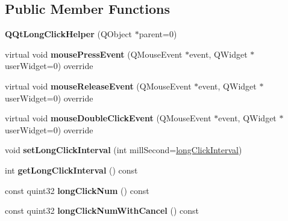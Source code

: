 \subsection*{Public Member Functions}
\begin{DoxyCompactItemize}
\item 
\mbox{\label{class_q_qt_long_click_helper_a66b65c1a0e470ca7849f98b37b6dff5f}} 
{\bfseries Q\+Qt\+Long\+Click\+Helper} (Q\+Object $\ast$parent=0)
\item 
\mbox{\label{class_q_qt_long_click_helper_ac7b35933971454a5544d1bdaacc788f7}} 
virtual void {\bfseries mouse\+Press\+Event} (Q\+Mouse\+Event $\ast$event, Q\+Widget $\ast$user\+Widget=0) override
\item 
\mbox{\label{class_q_qt_long_click_helper_a47ed080d282addb183847919bcb0ff88}} 
virtual void {\bfseries mouse\+Release\+Event} (Q\+Mouse\+Event $\ast$event, Q\+Widget $\ast$user\+Widget=0) override
\item 
\mbox{\label{class_q_qt_long_click_helper_a2fa0272b307ab6bee2a4dcdd3a1d662b}} 
virtual void {\bfseries mouse\+Double\+Click\+Event} (Q\+Mouse\+Event $\ast$event, Q\+Widget $\ast$user\+Widget=0) override
\item 
\mbox{\label{class_q_qt_long_click_helper_a0e9a46cd30c908bc8b714bbe971c9f3b}} 
void {\bfseries set\+Long\+Click\+Interval} (int mill\+Second=\mbox{\hyperlink{class_q_qt_long_click_helper_aae392691a102b1b7de765494bc5e6946}{long\+Click\+Interval}})
\item 
\mbox{\label{class_q_qt_long_click_helper_af07e17f4ff7f1e6b2b92f5ced8d22724}} 
int {\bfseries get\+Long\+Click\+Interval} () const
\item 
\mbox{\label{class_q_qt_long_click_helper_a9d663b1086991764a366bb3e682b884f}} 
const quint32 {\bfseries long\+Click\+Num} () const
\item 
\mbox{\label{class_q_qt_long_click_helper_a224ac2a2883dc127dc2d1a577aa2cc70}} 
const quint32 {\bfseries long\+Click\+Num\+With\+Cancel} () const
\end{DoxyCompactItemize}

